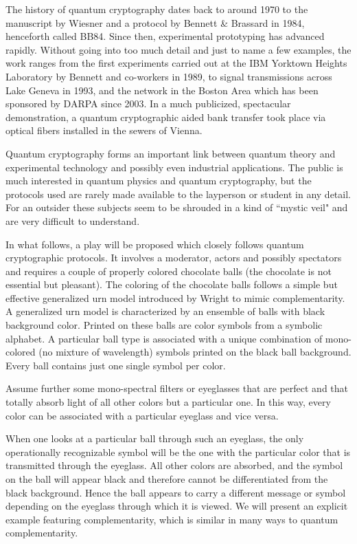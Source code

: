 \documentclass[prb,amssymb,preprint]{revtex4}
\begin{document}
The history of quantum cryptography dates back to around 1970 to the
manuscript by Wiesner\cite{wiesner} and a protocol
by Bennett \& Brassard\cite{benn-82,benn-84,ekert91,benn-92,gisin-qc-rmp}
in 1984, henceforth called BB84. Since
then, experimental prototyping has advanced rapidly.
Without going into too
much detail and just to name a few examples, the work ranges from the
first experiments carried out at the IBM Yorktown Heights Laboratory
by Bennett and co-workers in
1989,\cite{benn-92}
to signal transmissions across Lake Geneva in 1993,\cite{gisin-qc-rmp} and
the network in the Boston Area which has been sponsored by DARPA since
2003.\cite{ell-co-05} In a much publicized, spectacular demonstration, a
quantum cryptographic aided bank transfer took place via optical fibers
installed in the sewers of Vienna.\cite{pflmubpskwjz}

Quantum cryptography forms an important link between quantum theory and
experimental technology and possibly even industrial applications. The
public is much interested in quantum physics and quantum cryptography, but
the protocols used are rarely made available to the layperson or student in
any detail. For an outsider these subjects seem to be shrouded in a kind
of ``mystic veil" and are very difficult to understand.


In what follows,
a play will be proposed which closely follows quantum cryptographic protocols.
It involves a moderator, actors and possibly spectators
and requires a couple of properly colored chocolate balls
(the chocolate is not essential but pleasant).
The coloring of the chocolate balls follows
a simple but effective generalized urn
model introduced by Wright\cite{wright,wright:pent,svozil-2001-eua} to mimic
complementarity. A generalized urn model is
characterized by an ensemble of balls with black background color.
Printed on these balls are color symbols from a symbolic alphabet.
A particular ball type is associated with a unique combination of
mono-colored (no mixture of wavelength) symbols printed on the black ball
background. Every ball contains just one single symbol per color.

Assume further some mono-spectral filters or eyeglasses that are
perfect and that totally absorb light of all other colors
but a particular one.
In this way, every color can be associated with a particular eyeglass and
vice versa.

When one
looks
at a particular ball through such an eyeglass, the only operationally
recognizable symbol will be the one with the particular color that is
transmitted through the eyeglass. All other colors are absorbed, and the
symbol on the ball will appear black and therefore cannot be
differentiated from the black background. Hence the ball appears to carry a
different message or symbol depending on the eyeglass through which it is
viewed. We will present an explicit example featuring complementarity, which
is similar in many ways to quantum complementarity.
\end{document}
